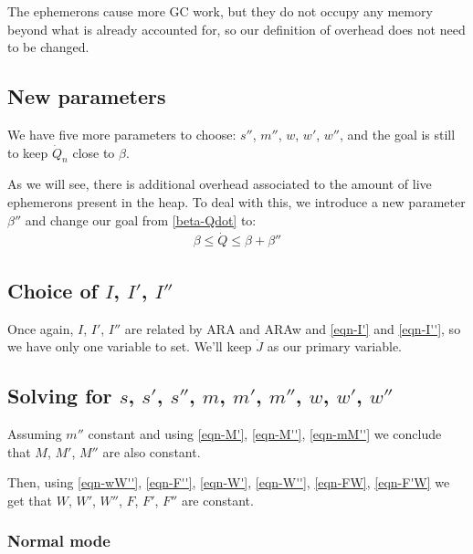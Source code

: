 \documentclass{article}
\begin{document}
The ephemerons cause more GC work, but they do not occupy any memory
beyond what is already accounted for, so our definition of overhead
does not need to be changed.

\subsection{New parameters}

We have five more parameters to choose: $s''$, $m''$, $w$, $w'$,
$w''$, and the goal
is still to keep $\dot{Q}_n$ close to $\beta$.

As we will see, there is additional overhead associated to the amount
of live ephemerons present in the heap. To deal with this, we
introduce a new parameter $\beta''$ and change our goal from
\eqref{beta-Qdot} to:
\begin{gather}
\beta \leq \dot{Q} \leq \beta + \beta'' \label{beta''-Qdot}
\end{gather}


\subsection[Choice of I, I', I'']{Choice of $I$, $I'$, $I''$}

Once again, $I$, $I'$, $I''$ are related by ARA and ARAw and
\eqref{eqn-I'} and \eqref{eqn-I''}, so we have only one variable to
set. We'll keep $\dot{J}$ as our primary variable.


\subsection[Solving for s, s', s'', m, m', m'', w, w', w'']
{Solving for $s$, $s'$, $s''$, $m$, $m'$, $m''$, $w$, $w'$, $w''$}

Assuming $m''$ constant
and using \eqref{eqn-M'}, \eqref{eqn-M''},
\eqref{eqn-mM''} we conclude that $M$, $M'$, $M''$
are also constant.

Then, using \eqref{eqn-wW''}, \eqref{eqn-F''}, \eqref{eqn-W'},
\eqref{eqn-W''}, \eqref{eqn-FW}, \eqref{eqn-F'W} we get that $W$,
$W'$, $W''$, $F$, $F'$, $F''$ are constant.


\subsubsection{Normal mode}
\end{document}
